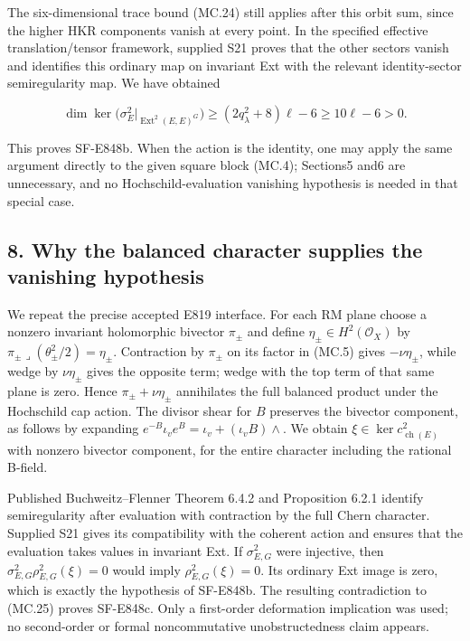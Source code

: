 The six-dimensional trace bound (MC.24) still applies after this orbit
sum, since the higher HKR components vanish at every point. In the
specified effective translation/tensor framework, supplied S21 proves
that the other sectors vanish and identifies this ordinary map on
invariant Ext with the relevant identity-sector semiregularity map.
We have obtained

\[
 \dim\ker\bigl(\sigma_E^2|_{\operatorname{Ext}^2(E,E)^G}\bigr)
   \ge (2q_\lambda^2+8)\ell-6
   \ge10\ell-6>0.
 \tag{MC.25}
\]

This proves SF-E848b. When the action is the identity, one may apply
the same argument directly to the given square block (MC.4); Sections5
and6 are unnecessary, and no Hochschild-evaluation vanishing hypothesis
is needed in that special case.

\subsection{8. Why the balanced character supplies the vanishing hypothesis}\label{SF-E848:s8}

We repeat the precise accepted E819 interface. For each RM plane
choose a nonzero invariant holomorphic bivector \(\pi_\pm\) and
define \(\eta_\pm\in H^2(\mathcal O_X)\) by
\(\pi_\pm\lrcorner(\theta_\pm^2/2)=\eta_\pm\). Contraction
by \(\pi_\pm\) on its factor in (MC.5) gives
\(-\nu\eta_\pm\), while wedge by \(\nu\eta_\pm\) gives the
opposite term; wedge with the top term of that same plane is zero.
Hence \(\pi_\pm+\nu\eta_\pm\) annihilates the full balanced
product under the Hochschild cap action. The divisor shear for \(B\)
preserves the bivector component, as follows by expanding
\(e^{-B}\iota_v e^B=\iota_v+(\iota_vB)\wedge\). We obtain
\(\xi\in\ker c^2_{\operatorname{ch}(E)}\) with nonzero bivector
component, for the entire character including the rational B-field.

Published Buchweitz--Flenner Theorem 6.4.2 and Proposition 6.2.1\cite{SF-BF2008} identify
semiregularity after evaluation with contraction by the full Chern
character. Supplied S21 gives its compatibility with the coherent action
and ensures that the evaluation takes values in invariant Ext. If
\(\sigma^2_{E,G}\) were injective, then
\(\sigma^2_{E,G}\rho^2_{E,G}(\xi)=0\) would imply
\(\rho^2_{E,G}(\xi)=0\). Its ordinary Ext image is zero, which is
exactly the hypothesis of SF-E848b. The resulting contradiction to
(MC.25) proves SF-E848c. Only a first-order deformation implication
was used; no second-order or formal noncommutative unobstructedness
claim appears.


